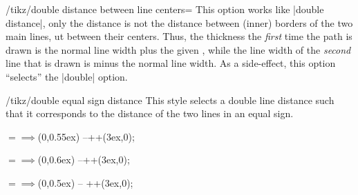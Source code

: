 \begin{key}{/tikz/double distance between line centers=}
  This option works like |double distance|, only the distance is not
  the distance between (inner) borders of the two main lines, ut
  between their centers. Thus, the thickness the
  \emph{first} time the path is drawn is the normal line width
  plus the given , while the line width of the
  \emph{second} line that is drawn is  minus the
  normal line width. As a side-effect, this option ``selects'' the
  |double| option. 

\begin{codeexample}[]
\end{codeexample}
\begin{codeexample}[]
\end{codeexample}
\end{key}

\begin{stylekey}{/tikz/double equal sign distance}
  This style selects a double line distance such that it corresponds
  to the distance of the two lines in an equal sign.
\begin{codeexample}[]
\Huge $=\implies$
                    (0,0.55ex) --++(3ex,0);
\end{codeexample}
\begin{codeexample}[]
\normalsize $=\implies$
                          (0,0.6ex) --++(3ex,0);
\end{codeexample}
\begin{codeexample}[]
\tiny $=\implies$
                   (0,0.5ex) -- ++(3ex,0);
\end{codeexample}  
\end{stylekey}

  




